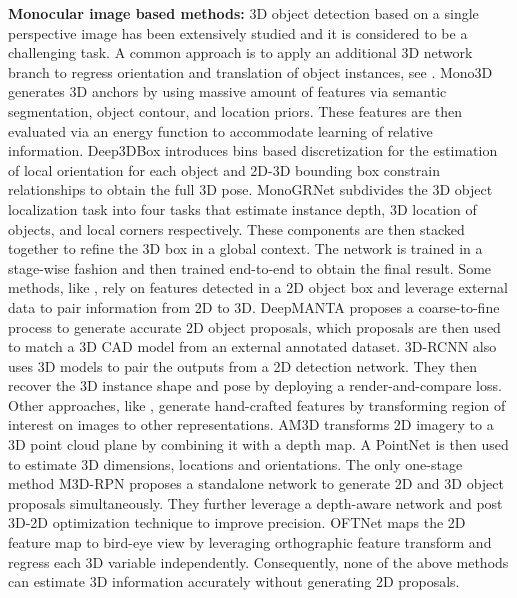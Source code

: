 \documentclass[10pt,twocolumn,letterpaper]{article}
\renewcommand{\paragraph}[1]{

        \vspace{3pt}
	\noindent\textbf{#1}}
\begin{document}
    \paragraph{Monocular image based methods:} 
    3D object detection based on a single perspective image has been extensively studied and it is considered to be a challenging task. A common approach is to apply an additional 3D network branch to regress orientation and translation of object instances, see \cite{mono3d_2016, deep3dbox_2017, mf3d_2018, fqnet_2019, GS3D_2019, monogr2019, roi10d_2019, monodis_2019}. Mono3D \cite{mono3d_2016} generates 3D anchors by using massive amount of features via semantic segmentation, object contour, and location priors. These features are then evaluated via an energy function to accommodate learning of relative information. Deep3DBox \cite{deep3dbox_2017} introduces bins based discretization for the estimation of local orientation for each object and 2D-3D bounding box constrain relationships to obtain the full 3D pose. MonoGRNet \cite{monogr2019} subdivides the 3D object localization task into four tasks that estimate instance depth, 3D location of objects, and local corners respectively. These components are then stacked together to refine the 3D box in a global context. The network is trained in a stage-wise fashion and then trained end-to-end to obtain the final result. Some methods, like \cite{subcnn_2017, deepmanta_2017, 3drcnn_2018}, rely on features detected in a 2D object box and leverage external data to pair information from 2D to 3D. DeepMANTA \cite{deepmanta_2017} proposes a coarse-to-fine process to generate accurate 2D object proposals, which proposals are then used to match a 3D CAD model from an external annotated dataset. 3D-RCNN \cite{3drcnn_2018} also uses 3D models to pair the outputs from a 2D detection network. They then recover the 3D instance shape and pose by deploying a render-and-compare loss. Other approaches, like \cite{am3d_2019, monopl_2019, monopsr_2019}, generate hand-crafted features by transforming region of interest on images to other representations. AM3D transforms 2D imagery to a 3D point cloud plane by combining it with a depth map. A PointNet \cite{pointnet_2017} is then used to estimate 3D dimensions, locations and orientations. The only one-stage method M3D-RPN \cite{m3drpn_2019} proposes a standalone network to generate 2D and 3D object proposals simultaneously. They further leverage a depth-aware network and post 3D-2D optimization technique to improve precision. OFTNet \cite{oft_2019} maps the 2D feature map to bird-eye view by leveraging orthographic feature transform and regress each 3D variable independently. Consequently, none of the above methods can estimate 3D information accurately without generating 2D proposals. 
\end{document}
